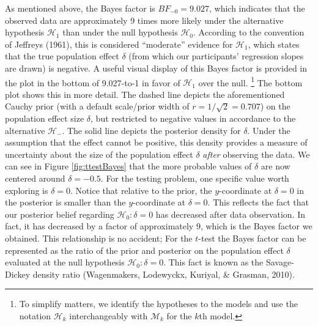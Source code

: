 \documentclass[english,,doc,floatsintext]{apa6}
\begin{document}
As mentioned above, the Bayes factor is \(BF_{-0}=9.027\), which indicates that the observed data are approximately 9 times more likely under the alternative hypothesis \(\mathcal{H}_{1}\) than under the null hypothesis \(\mathcal{H}_{0}\). According to the convention of Jeffreys (1961), this is considered \enquote{moderate} evidence for \(\mathcal{H}_{1}\), which states that the true population effect \(\delta\) (from which our participants' regression slopes are drawn) is negative. A useful visual display of this Bayes factor is provided in the plot in the bottom of 9.027-to-1 in favor of \(\mathcal{H}_{1}\) over the null.
\footnote{To simplify matters, we identify the hypotheses to the models and use the notation \( \mathcal{H}_{k} \) interchangeably with \( \mathcal{M}_{k} \) for the \( k \)th model.}
The bottom plot shows this in more detail. The dashed line depicts the aforementioned Cauchy prior (with a default scale/prior width of \(r=1/\sqrt{2} = 0.707\)) on the population effect size \(\delta\), but restricted to negative values in accordance to the alternative \(\mathcal{H}_{-}\). The solid line depicts the posterior density for \(\delta\). Under the assumption that the effect cannot be positive, this density provides a measure of uncertainty about the size of the population effect \(\delta\) \emph{after} observing the data. We can see in Figure \ref{fig:ttestBayes} that the more probable values of \(\delta\) are now centered around \(\delta = -0.5\). For the testing problem, one specific value worth exploring is \(\delta=0\). Notice that relative to the prior, the \(y\)-coordinate at \(\delta=0\) in the posterior is smaller than the \(y\)-coordinate at \(\delta=0\). This reflects the fact that our posterior belief regarding \(\mathcal{H}_{0} : \delta = 0\) has decreased after data observation. In fact, it has decreased by a factor of approximately 9, which is the Bayes factor we obtained. This relationship is no accident; For the \(t\)-test the Bayes factor can be represented as the ratio of the prior and posterior on the population effect \(\delta\) evaluated at the null hypothesis \(\mathcal{H}_{0}: \delta = 0\). This fact is known as the Savage-Dickey density ratio (Wagenmakers, Lodewyckx, Kuriyal, \& Grasman, 2010).
\end{document}
